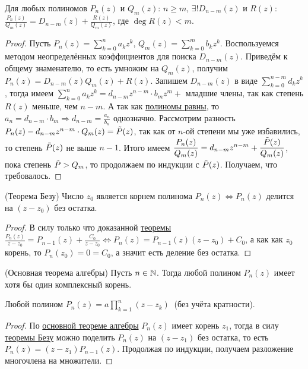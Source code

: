 \begin{theorem}
    \hypertarget{thm6.4}{Для любых полиномов $P_{n} (z)$ и $Q_{m} (z)$: $n \geq m$, $\exists! D_{n - m} (z)$ и $R (z)$: $\displaystyle \frac{P_{n} (z)}{Q_{m} (z)} = D_{n - m} (z) + \frac{R (z)}{Q_{m} (z)}$, где $\deg{R (z)} < m$.}
\end{theorem}
\begin{proof}
    Пусть $\displaystyle P_{n} (z) = \sum_{k = 0}^{n} a_{k} z^{k}$, $\displaystyle Q_{m} (z) = \sum_{k = 0}^{m} b_{k} z^{k}$. Воспользуемся методом неопределённых коэффициентов для поиска $D_{n - m} (z)$. Приведём к общему знаменателю, то есть умножим на $Q_{m} (z)$, получим $P_{n} (z) = D_{n - m} (z) Q_{m} (z) + R (z)$. Запишем $D_{n - m} (z)$ в виде $\displaystyle \sum_{k = 0}^{n - m} d_{k} z^{k}$, тогда имеем $\displaystyle \sum_{k = 0}^{n} a_{k} z^{k} = d_{n - m} z^{n - m} \cdot b_{m} z^{m} +$ младшие члены, так как степень $R (z)$ меньше, чем $n - m$. А так как \hyperlink{prop6.1}{полиномы равны}, то $\displaystyle a_{n} = d_{n - m} \cdot b_{m} \Rightarrow d_{n - m} = \frac{a_{n}}{b_{n}}$ однозначно. Рассмотрим разность $P_{n} (z) - d_{n - m} z^{n - m} \cdot Q_{m} (z) = \Tilde{P} (z)$, так как от $n$-ой степени мы уже избавились, то степень $\Tilde{P} (z)$ не выше $n - 1$. Итого имеем $\displaystyle \frac{P_{n} (z)}{Q_{m} (z)} = d_{n - m} z^{n - m} + \frac{\Tilde{P} (z)}{Q_{m} (z)}$, пока степень $\Tilde{P} > Q_{m}$, то продолжаем по индукции с $\Tilde{P} (z)$. Получаем, что требовалось.
\end{proof}
\begin{theorem}
    \hypertarget{thm6.5}{(Теорема Безу) Число $z_{0}$ является корнем полинома $P_{n} (z) \Leftrightarrow P_{n} (z)$ делится на $(z - z_{0})$ без остатка.}
\end{theorem}
\begin{proof}
    В силу только что доказанной \hyperlink{thm6.4}{теоремы} $\displaystyle \frac{P_{n} (z)}{z - z_{0}} = P_{n - 1} (z) + \frac{C_{0}}{z - z_{0}} \Leftrightarrow P_{n} (z) = P_{n - 1} (z) (z - z_{0}) + C_{0}$, а как как $z_{0}$ корень, то $P_{n} (z_{0}) = 0 = C_{0}$, а значит есть деление без остатка.
\end{proof}
\begin{theorem}
    \hypertarget{thm6.6}{(Основная теорема алгебры) Пусть $n \in \mathbb{N}$. Тогда любой полином $P_{n} (z)$ имеет хотя бы один комплексный корень.}
\end{theorem}
\begin{corollary}
    Любой полином $\displaystyle P_{n} (z) = a \prod_{k = 1}^{n} (z - z_{k}) \ $ (без учёта кратности).
\end{corollary}
\begin{proof}
    По \hyperlink{thm6.6}{основной теореме алгебры} $P_{n} (z)$ имеет корень $z_{1}$, тогда в силу \hyperlink{thm6.5}{теоремы Безу} можно поделить $P_{n} (z)$ на $(z - z_{1})$ без остатка, то есть $P_{n} (z) = (z - z_{1}) P_{n - 1} (z)$. Продолжая по индукции, получаем разложение многочлена на множители.
\end{proof}